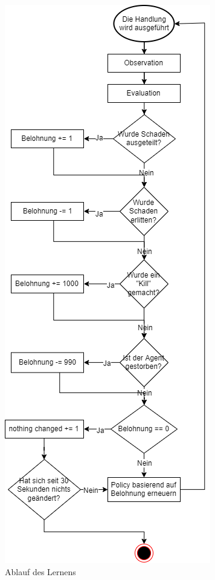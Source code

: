 \begin{figure}[H]
    \centering
    \includegraphics[scale=0.7]{pics/ai/Fluss.png}
    \caption{Ablauf des Lernens}
    \label{fig:maai:fluss}
\end{figure}

